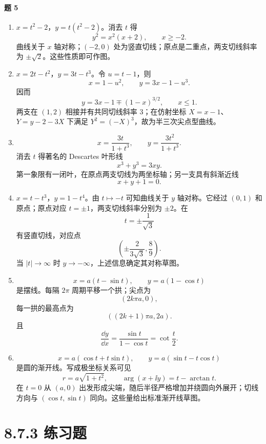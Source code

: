 \paragraph{题 5}
\begin{xsolution}
\begin{enumerate}[label=(\arabic*)]
  \item $x=t^2-2$，$y=t(t^2-2)$。消去 $t$ 得
  \[
    y^2=x^2(x+2),\qquad x\ge-2.
  \]
  曲线关于 $x$ 轴对称；$(-2,0)$ 处为竖直切线；原点是二重点，两支切线斜率为 $\pm\sqrt2$。这些性质即可作图。

  \item $x=2t-t^2$，$y=3t-t^3$。令 $u=t-1$，则
  \[
    x=1-u^2,
    \qquad
    y=3x-1-u^3.
  \]
  因而
  \[
    y=3x-1\mp(1-x)^{3/2},\qquad x\le1.
  \]
  两支在 $(1,2)$ 相接并有共同切线斜率 3；在仿射坐标 $X=x-1$、$Y=y-2-3X$ 下满足 $Y^2=(-X)^3$，故为半三次尖点型曲线。

  \item
  \[
    x=\frac{3t}{1+t^3},\qquad y=\frac{3t^2}{1+t^3}.
  \]
  消去 $t$ 得著名的 Descartes 叶形线
  \[
    x^3+y^3=3xy.
  \]
  第一象限有一闭叶，在原点两支切线为两坐标轴；另一支具有斜渐近线
  \[
    x+y+1=0.
  \]

  \item $x=t-t^3$，$y=1-t^4$。由 $t\mapsto-t$ 可知曲线关于 $y$ 轴对称。它经过 $(0,1)$ 和原点；原点对应 $t=\pm1$，两支切线斜率分别为 $\pm2$。在
  \[
    t=\pm\frac1{\sqrt3}
  \]
  有竖直切线，对应点
  \[
    \left(\pm\frac{2}{3\sqrt3},\frac89\right).
  \]
  当 $|t|\to\infty$ 时 $y\to-\infty$，上述信息确定其对称草图。

  \item
  \[
    x=a(t-\sin t),\qquad y=a(1-\cos t)
  \]
  是摆线。每隔 $2\pi$ 周期平移一个拱；尖点为
  \[
    (2k\pi a,0),
  \]
  每一拱的最高点为
  \[
    ((2k+1)\pi a,2a).
  \]
  且
  \[
    \frac{\dd y}{\dd x}=\frac{\sin t}{1-\cos t}=\cot\frac t2.
  \]

  \item
  \[
    x=a(\cos t+t\sin t),\qquad
    y=a(\sin t-t\cos t)
  \]
  是圆的渐开线。写成极坐标关系可见
  \[
    r=a\sqrt{1+t^2},
    \qquad
    \arg(x+\ii y)=t-\arctan t.
  \]
  在 $t=0$ 从 $(a,0)$ 出发形成尖端，随后半径严格增加并绕圆向外展开；切线方向与 $(\cos t,\sin t)$ 同向。这些量给出标准渐开线草图。
\end{enumerate}
\end{xsolution}

\section*{8.7.3 练习题}

